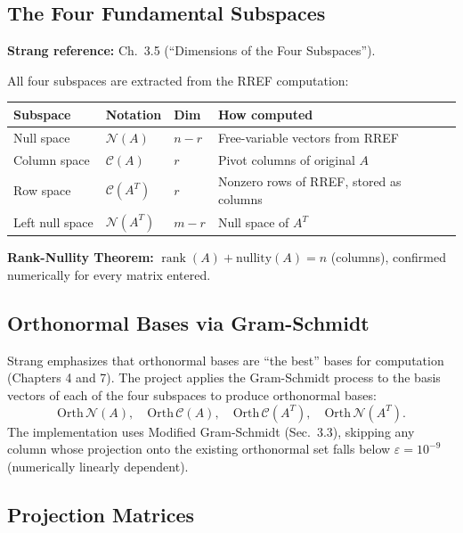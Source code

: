 \documentclass[12pt, a4paper]{article}
\newcommand{\Null}{\mathcal{N}}
\newcommand{\Col}{\mathcal{C}}
\newcommand{\rank}{\operatorname{rank}}
\begin{document}
\subsection{The Four Fundamental Subspaces}

\textbf{Strang reference:} Ch.\ 3.5 (``Dimensions of the Four Subspaces'').

All four subspaces are extracted from the RREF computation:

\begin{center}
\small\renewcommand{\arraystretch}{1.4}
\begin{tabular}{p{2.6cm} p{2.2cm} p{1.8cm} p{6.0cm}}
\toprule
Subspace & Notation & Dim & How computed \\
\midrule
Null space & $\Null(A)$ & $n - r$ & Free-variable vectors from RREF \\
Column space & $\Col(A)$ & $r$ & Pivot columns of original $A$ \\
Row space & $\Col(A^T)$ & $r$ & Nonzero rows of RREF, stored as columns \\
Left null space & $\Null(A^T)$ & $m - r$ & Null space of $A^T$ \\
\bottomrule
\end{tabular}
\end{center}

\noindent
\textbf{Rank-Nullity Theorem:} $\rank(A) + \text{nullity}(A) = n$ (columns),
confirmed numerically for every matrix entered.

\subsection{Orthonormal Bases via Gram-Schmidt}

Strang emphasizes that orthonormal bases are ``the best'' bases for
computation (Chapters 4 and 7).  The project applies the Gram-Schmidt process
to the basis vectors of each of the four subspaces to produce orthonormal
bases:
\[
  \text{Orth}\,\Null(A),\quad
  \text{Orth}\,\Col(A),\quad
  \text{Orth}\,\Col(A^T),\quad
  \text{Orth}\,\Null(A^T).
\]
The implementation uses Modified Gram-Schmidt (Sec.\ 3.3), skipping any column
whose projection onto the existing orthonormal set falls below $\varepsilon =
10^{-9}$ (numerically linearly dependent).

\subsection{Projection Matrices}
\end{document}
